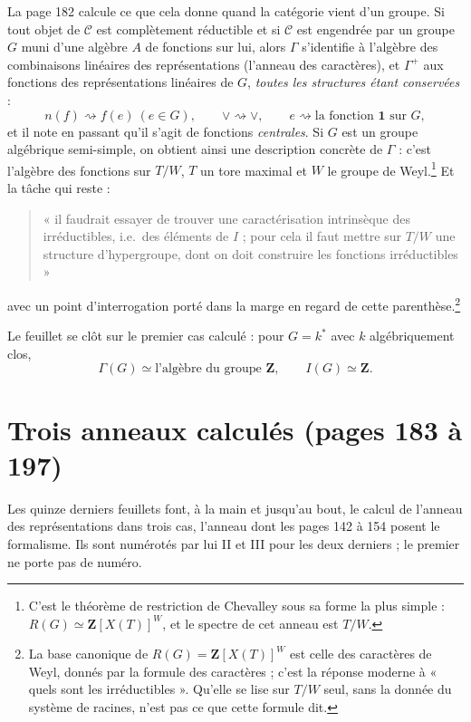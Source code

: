 \documentclass[11pt,a4paper]{article}
\begin{document}
La page 182 calcule ce que cela donne quand la catégorie vient d'un groupe. Si
tout objet de $\mathcal{C}$ est complètement réductible et si $\mathcal{C}$ est
engendrée par un groupe $G$ muni d'une algèbre $A$ de fonctions sur lui, alors
$\Gamma$ s'identifie à l'algèbre des combinaisons linéaires des représentations
(l'anneau des caractères), et $\Gamma^{+}$ aux fonctions des
représentations linéaires de $G$, \emph{toutes les structures étant
conservées} :
\[
n(f) \rightsquigarrow f(e) \ (e \in G) ,
\qquad
\vee \rightsquigarrow \vee ,
\qquad
e \rightsquigarrow \text{la fonction } \mathbf{1} \text{ sur } G ,
\]
et il note en passant qu'il s'agit de fonctions \emph{centrales}. Si $G$ est un
groupe algébrique semi-simple, on obtient ainsi une description concrète de
$\Gamma$ : c'est l'algèbre des fonctions sur $T/W$, $T$ un tore maximal et $W$
le groupe de Weyl.\footnote{C'est le théorème de restriction de Chevalley sous
sa forme la plus simple : $R(G) \simeq \mathbf{Z}[X(T)]^{W}$, et le spectre de
cet anneau est $T/W$.} Et la tâche qui reste :
\begin{quote}
« il faudrait essayer de trouver une caractérisation intrinsèque des
irréductibles, i.e.\ des éléments de $I$ ; pour cela il faut mettre sur $T/W$
une structure d'hypergroupe, dont on doit construire les fonctions
irréductibles »
\end{quote}
avec un point d'interrogation porté dans la marge en regard de cette
parenthèse.\footnote{La base canonique de $R(G) = \mathbf{Z}[X(T)]^{W}$ est
celle des caractères de Weyl, donnés par la formule des caractères ; c'est la
réponse moderne à « quels sont les irréductibles ». Qu'elle se lise sur $T/W$
seul, sans la donnée du système de racines, n'est pas ce que cette formule
dit.}

Le feuillet se clôt sur le premier cas calculé : pour $G = k^{*}$ avec $k$
algébriquement clos,
\[
\Gamma(G) \simeq \text{l'algèbre du groupe } \mathbf{Z} ,
\qquad I(G) \simeq \mathbf{Z} .
\]

\section*{Trois anneaux calculés (pages 183 à 197)}

Les quinze derniers feuillets font, à la main et jusqu'au bout, le calcul de
l'anneau des représentations dans trois cas, l'anneau dont les pages 142 à
154 posent le formalisme. Ils sont numérotés par lui II et III pour les deux derniers ; le
premier ne porte pas de numéro.
\end{document}
